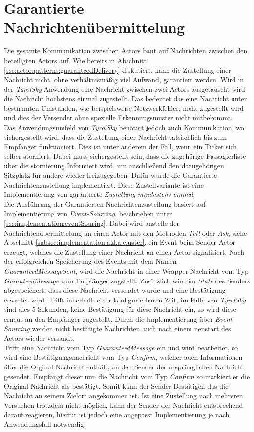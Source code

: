 \section{Garantierte Nachrichtenübermittelung}
Die gesamte Kommunikation zwischen Actors baut auf Nachrichten zwischen den beteiligten Actors auf. Wie bereits in Abschnitt \ref{sec:actor:patterns:guaranteedDelivery} diskutiert. kann die Zustellung einer Nachricht nicht, ohne verhältnismäßig viel Aufwand, garantiert werden. Wird in der \textit{TyrolSky} Anwendung eine Nachricht zwischen zwei Actors ausgetauscht wird die Nachricht höchstens einmal zugestellt. Das bedeutet das eine Nachricht unter bestimmten Umständen, wie beispielsweise Netzwerkfehler, nicht zugestellt wird und dies der Versender ohne spezielle Erkennungsmuster nicht mitbekommt. \\
Das Anwendungsumfeld von \textit{TyrolSky} benötigt jedoch auch Kommunikation, wo sichergestellt wird, dass die Zustellung einer Nachricht tatsächlich bis zum Empfänger funktioniert. Dies ist unter anderem der Fall, wenn ein Ticket sich selber storniert. Dabei muss sichergestellt sein, dass die zugehörige Passagierliste über die stornierung Informiert wird, um anschließend den dazugehörigen Sitzplatz für andere wieder freizugegeben. Dafür wurde die Garantierte Nachrichtenzustellung implementiert. Diese Zustellvariante ist eine Implementierung von garantierte \textit{Zustellung mindestens einmal}. \\
Die Ausführung der Garantierten Nachrichtenzustellung basiert auf Implementierung von \textit{Event-Sourcing}, beschrieben unter \ref{sec:implementation:eventSouring}. Dabei wird anstelle der Nachrichtenübermittelung an einen Actor mit den Methoden \textit{Tell} oder \textit{Ask}, siehe Abschnitt \ref{subsec:implementation:akka:cluster}, ein Event beim Sender Actor erzeugt, welches die Zustellung einer Nachricht an einen Actor signalisiert. Nach der erfolgreichen Speicherung des Events mit dem Namen \textit{GuaranteedMessageSent}, wird die Nachricht in einer Wrapper Nachricht vom Typ \textit{GuranteedMessage} zum Empfänger zugstellt. Zusätzlich wird im \textit{State} des Senders abgespeichert, dass diese Nachricht versendet wurde und eine Bestätigung erwartet wird. Trifft innerhalb einer konfigurierbaren Zeit, im Falle von \textit{TyrolSky} sind dies 5 Sekunden, keine Bestätigung für diese Nachricht ein, so wird diese erneut an den Empfänger zugestellt. Durch die Implementierung über \textit{Event Sourcing} werden nicht bestätigte Nachrichten auch nach einem neustart des Actors wieder versandt. \\
Trifft eine Nachricht vom Typ \textit{GuaranteedMessage} ein und wird bearbeitet, so wird eine Bestätigungsnachricht vom Typ \textit{Confirm}, welcher auch Informationen über die Orginal Nachricht enthält, an den Sender der ursprünglichen Nachricht gesendet. Empfängt dieser nun die Nachricht vom Typ \textit{Confirm} so markiert er die Original Nachricht als bestätigt. Somit kann der Sender Bestätigen das die Nachricht an seinem Zielort angekommen ist. Ist eine Zustellung nach mehreren Versuchen trotzdem nicht möglich, kann der Sender der Nachricht entsprechend darauf reagieren, hierfür ist jedoch eine angepasst Implementierung je nach Anwendungsfall notwendig. \\